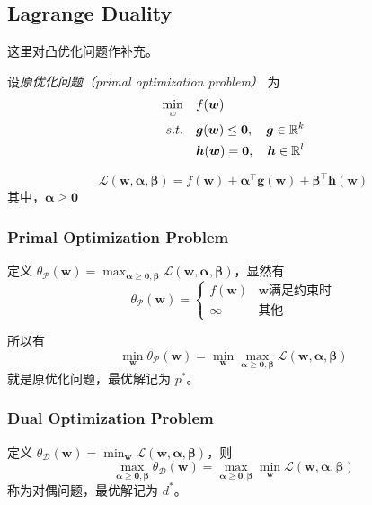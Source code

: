 \subsection{Lagrange Duality}
	这里对凸优化问题作补充。
	
	设\emph{原优化问题（primal optimization problem）} 为
	\begin{align*}
	\min_w\quad & f(\bm{w}) \\
	s.t. \quad & \bm{g}(\bm{w}) \leq \bm{0}, \quad \bm{g} \in \mathbb{R}^k \\
	& \bm{h}(\bm{w}) = \bm{0}, \quad \bm{h} \in \mathbb{R}^l
	\end{align*}
	
	\begin{df}
		\begin{equation}
		\mathcal{L}(\bm{w}, \bm{\alpha}, \bm{\beta}) = f(\bm{w}) + \bm{\alpha}^\intercal \bm{g}(\bm{w}) + \bm{\beta}^\intercal \bm{h}(\bm{w})
		\end{equation}
		其中，$ \bm{\alpha} \geq \bm{0} $
	\end{df}
	
	\subsubsection{Primal Optimization Problem}
		定义 $ \theta_\mathcal{P}(\bm{w}) = \max_{\bm{\alpha} \geq \bm{0}, \bm{\beta}}{\mathcal{L}(\bm{w}, \bm{\alpha}, \bm{\beta})} $，显然有
		\begin{equation*}
		\theta_\mathcal{P}(\bm{w}) = 
		\begin{cases}
		f(\bm{w}) & \bm{w} \text{满足约束时} \\
		\infty & \text{其他}
		\end{cases}
		\end{equation*}
		
		所以有
		\begin{equation}
		\min_{\bm{w}}{\theta_\mathcal{P}(\bm{w})} = \min_{\bm{w}}{\max_{\bm{\alpha} \geq \bm{0}, \bm{\beta}}{\mathcal{L}(\bm{w}, \bm{\alpha}, \bm{\beta})}}
		\end{equation}
		就是原优化问题，最优解记为 $ p^* $。
		
	\subsubsection{Dual Optimization Problem}
		定义 $ \theta_\mathcal{D}(\bm{w}) = \min_{\bm{w}}{\mathcal{L}(\bm{w}, \bm{\alpha}, \bm{\beta})} $，则
		\begin{equation}
		\max_{\bm{\alpha} \geq \bm{0}, \bm{\beta}}{\theta_\mathcal{D}(\bm{w})} = \max_{\bm{\alpha} \geq \bm{0}, \bm{\beta}}\min_{\bm{w}}{\mathcal{L}(\bm{w}, \bm{\alpha}, \bm{\beta})} \label{dual-opt-problem}
		\end{equation}
		称为对偶问题，最优解记为 $ d^* $。
		
